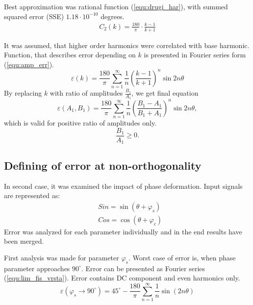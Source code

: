 \documentclass[a4paper]{article}
\begin{document}
Best approximation was rational function  (\ref{equ:drugi_har}), with summed squared error (SSE) $1.18 \cdot 10^{-10}$ degrees.
\begin{eqnarray}
\label{equ:drugi_har}
C_2(k)=\frac{180}{\pi}\cdot\frac{k-1}{k+1}
\end{eqnarray}

It was assumed, that higher order harmonics were correlated with base harmonic. Function, that describes error  depending on $k$ is presented in Fourier series form (\ref{equ:amp_err}).
\begin{equation}
\label{equ:amp_err}
\varepsilon(k) =\frac{180}{\pi}\sum_{n=1}^{\infty}\frac{1}{n}(\frac{k-1}{k+1})^n \sin 2 n \theta
\end{equation}
By replacing $k$ with ratio of amplitudes $\frac{B_1}{A_1}$, we get final equation
\begin{equation}
\label{equ:amp_err2}
\varepsilon(A_1, B_1) =\frac{180}{\pi}\sum_{n=1}^{\infty}\frac{1}{n}(\frac{B_1-A_1}{B_1+A_1})^n \sin 2 n \theta,
\end{equation}
which is valid for positive ratio of amplitudes only.
 $$\frac{B_1}{A_1} \geq 0.$$

\subsection{Defining of error at non-orthogonality}
In second case, it was examined the impact of phase deformation. Input signals are represented as:
\begin{eqnarray}
\label{equ:def_sin_fis}
&Sin = \sin(\theta + \varphi_{s})\\
\label{equ:def_cos_fis}
&Cos =\cos(\theta+\varphi_{c})
\end{eqnarray}
Error was analyzed for each parameter individually and in the end results have been merged.

First analysis was made for parameter $\varphi_s$.
Worst case of error is, when phase parameter approaches $90^\circ$. Error can be presented as Fourier series (\ref{equ:lim_fis_vrsta}). Error contains DC component and even harmonics only.
\begin{equation}
\label{equ:lim_fis_vrsta}
\varepsilon(\varphi_{s} \rightarrow 90^\circ) = 45^\circ - \frac{180}{\pi}\sum_{n=1}^{\infty}\frac{1}{n} \sin (2n \theta)
\end{equation}
\end{document}

